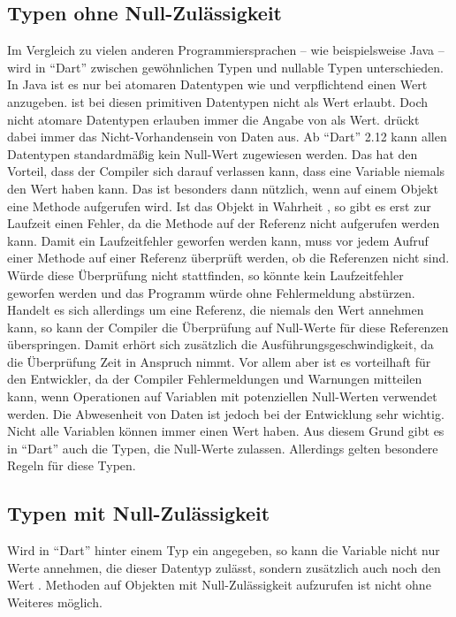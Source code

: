 \subsection{Typen ohne Null-Zulässigkeit} Im Vergleich zu vielen anderen Programmiersprachen -- wie beispielsweise Java -- wird in \enquote{Dart} zwischen gewöhnlichen Typen und nullable Typen unterschieden.
In Java ist es nur bei atomaren Datentypen wie  und  verpflichtend einen Wert anzugeben.
 ist bei diesen primitiven Datentypen nicht als Wert erlaubt.
Doch nicht atomare Datentypen erlauben immer die Angabe von  als Wert.
 drückt dabei immer das Nicht-Vorhandensein von Daten aus.
Ab \enquote{Dart} 2.12   kann allen Datentypen standardmäßig kein Null-Wert zugewiesen werden. 
Das hat den Vorteil, dass der Compiler sich darauf verlassen kann, 
dass eine Variable niemals den Wert  haben kann. 
Das ist besonders dann nützlich, 
wenn auf einem Objekt eine Methode aufgerufen wird. 
Ist das Objekt in Wahrheit , 
so gibt es erst zur Laufzeit einen Fehler, 
da die Methode auf der Referenz  nicht aufgerufen werden kann. 
Damit ein Laufzeitfehler geworfen werden kann, 
muss vor jedem Aufruf einer Methode auf einer Referenz überprüft werden, ob die Referenzen nicht  sind. 
Würde diese Überprüfung nicht stattfinden, 
so könnte kein Laufzeitfehler geworfen werden und das Programm würde ohne Fehlermeldung abstürzen. 
Handelt es sich allerdings um eine Referenz, 
die niemals den Wert  annehmen kann, 
so kann der Compiler die Überprüfung auf Null-Werte für diese Referenzen überspringen. 
Damit erhört sich zusätzlich die Ausführungsgeschwindigkeit, 
da die Überprüfung Zeit in Anspruch nimmt. 
Vor allem aber ist es vorteilhaft für den Entwickler, 
da der Compiler  Fehlermeldungen und Warnungen mitteilen kann, 
wenn Operationen auf Variablen mit potenziellen Null-Werten verwendet werden. 
Die Abwesenheit von Daten ist jedoch bei der Entwicklung sehr wichtig. 
Nicht alle Variablen können immer einen Wert haben. 
Aus diesem Grund gibt es in \enquote{Dart} auch die Typen, 
die Null-Werte zulassen.
Allerdings gelten besondere Regeln für diese Typen.

\subsection{Typen mit Null-Zulässigkeit}
\label{sec:TypenMitNullZulaessigkeit}

Wird in \enquote{Dart} hinter einem Typ ein  angegeben, 
so kann die Variable nicht nur  Werte annehmen, die dieser Datentyp zulässt,
sondern zusätzlich auch noch den Wert .
Methoden auf Objekten mit Null-Zulässigkeit aufzurufen ist nicht ohne Weiteres möglich.

